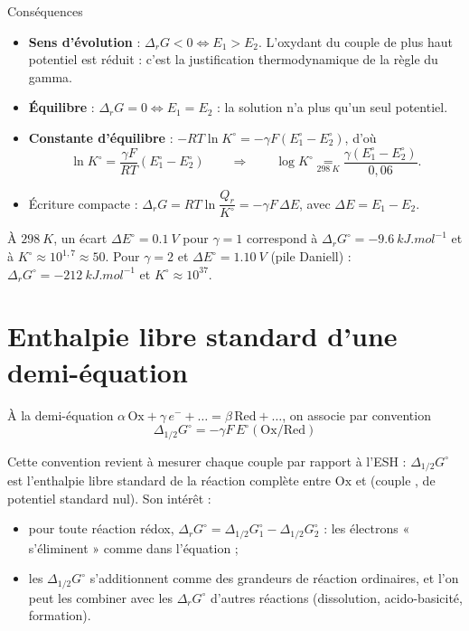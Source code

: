 \begin{resultat}{Conséquences}
\begin{itemize}
  \item \textbf{Sens d'évolution} : $\Delta_rG < 0 \Leftrightarrow E_1 > E_2$. L'oxydant du couple de plus haut potentiel est réduit : c'est la justification thermodynamique de la règle du gamma.
  \item \textbf{Équilibre} : $\Delta_rG = 0 \Leftrightarrow E_1 = E_2$ : la solution n'a plus qu'un seul potentiel.
  \item \textbf{Constante d'équilibre} : $-RT\ln K^\circ = -\gamma F(E_1^\circ - E_2^\circ)$, d'où
  \[ \ln K^\circ = \frac{\gamma F}{RT}(E_1^\circ - E_2^\circ) \qquad\Longrightarrow\qquad \log K^\circ \underset{\SI{298}{K}}{=} \frac{\gamma(E_1^\circ - E_2^\circ)}{0{,}06}. \]
  \item Écriture compacte : $\Delta_rG = RT\ln\dfrac{Q_r}{K^\circ} = -\gamma F\,\Delta E$, avec $\Delta E = E_1 - E_2$.
\end{itemize}
\end{resultat}

\begin{ordres}
À $\SI{298}{K}$, un écart $\Delta E^\circ = \SI{0,1}{V}$ pour $\gamma = 1$ correspond à $\Delta_rG^\circ = \SI{-9,6}{kJ.mol^{-1}}$ et à $K^\circ\approx 10^{1{,}7}\approx 50$. Pour $\gamma = 2$ et $\Delta E^\circ = \SI{1,10}{V}$ (pile Daniell) : $\Delta_rG^\circ = \SI{-212}{kJ.mol^{-1}}$ et $K^\circ \approx 10^{37}$.
\end{ordres}

\section{Enthalpie libre standard d'une demi-équation}

\begin{definition}
À la demi-équation $\alpha\,\mathrm{Ox} + \gamma\,e^- + \dots = \beta\,\mathrm{Red} + \dots$, on associe par convention
\[ \boxed{\Delta_{1/2}G^\circ = -\gamma F\,E^\circ(\mathrm{Ox/Red})} \]
\end{definition}

Cette convention revient à mesurer chaque couple par rapport à l'ESH : $\Delta_{1/2}G^\circ$ est l'enthalpie libre standard de la réaction complète entre $\mathrm{Ox}$ et  (couple , de potentiel standard nul). Son intérêt :
\begin{itemize}
  \item pour toute réaction rédox, $\Delta_rG^\circ = \Delta_{1/2}G_1^\circ - \Delta_{1/2}G_2^\circ$ : les électrons « s'éliminent » comme dans l'équation ;
  \item les $\Delta_{1/2}G^\circ$ s'additionnent comme des grandeurs de réaction ordinaires, et l'on peut les combiner avec les $\Delta_rG^\circ$ d'autres réactions (dissolution, acido-basicité, formation).
\end{itemize}

